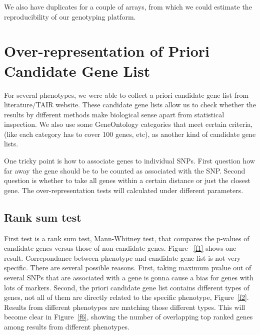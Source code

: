 \documentclass[a4paper,10pt]{article}
\begin{document}
We also have duplicates for a couple of arrays, from which we could estimate the reproducibility of our genotyping platform.

\section{Over-representation of Priori Candidate Gene List}
For several phenotypes, we were able to collect a priori candidate gene list from literature/TAIR website. These candidate gene lists allow us to check whether the results by different methods make biological sense apart from statistical inspection. We also use some GeneOntology categories that meet certain criteria, (like each category has to cover 100 genes, etc), as another kind of candidate gene lists.

One tricky point is how to associate genes to individual SNPs. First question how far away the gene should be to be counted as associated with the SNP. Second question is whether to take all genes within a certain distance or just the closest gene. The over-representation tests will calculated under different parameters.

\subsection{Rank sum test}

First test is a rank sum test, Mann-Whitney test, that compares the p-values of candidate genes versus those of non-candidate genes. Figure ~\ref{f1} shows one result. Correpondance between phenotype and candidate gene list is not very specific. There are several possible reasons. First, taking maximum pvalue out of several SNPs that are associated with a gene is gonna cause a bias for genes with lots of markers. Second, the priori candidate gene list contains different types of genes, not all of them are directly related to the specific phenotype, Figure~\ref{f2}. Results from different phenotypes are matching those different types. This will become clear in Figure~\ref{f6}, showing the number of overlapping top ranked genes among results from different phenotypes.
\end{document}
